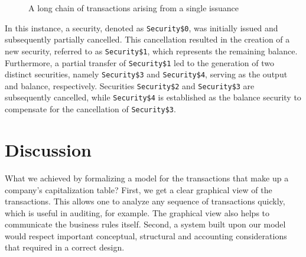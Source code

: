 \begin{figure}[!h]
	\centering
	\caption{A long chain of \glspl{transaction} arising from a single issuance}\label{fig:tt-alloy-example-transaction-single-issuance}
\end{figure}

In this instance, a security, denoted as \verb|Security$0|, was initially issued and subsequently partially cancelled. This cancellation resulted in the creation of a new security, referred to as \verb|Security$1|, which represents the remaining balance. Furthermore, a partial transfer of \verb|Security$1| led to the generation of two distinct securities, namely \verb|Security$3| and \verb|Security$4|, serving as the output and balance, respectively. Securities \verb|Security$2| and \verb|Security$3| are subsequently cancelled, while \verb|Security$4| is established as the balance \gls{security} to compensate for the cancellation of \verb|Security$3|.

\section{Discussion}

What we achieved by formalizing a model for the transactions that make up a company's capitalization table? First, we get a clear graphical view of the transactions. This allows one to analyze any sequence of transactions quickly, which is useful in auditing, for example. The graphical view also helps to communicate the business rules itself. Second, a system built upon our model would respect important conceptual, structural and accounting considerations that required in a correct design.

